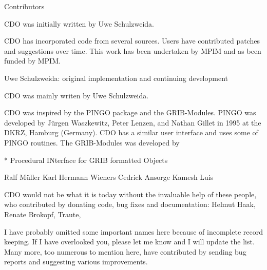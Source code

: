 Contributors

CDO was initially written by Uwe Schulzweida.

CDO has incorporated code from several sources. Users have contributed patches and suggestions over time. This work has been undertaken by MPIM and as been funded by MPIM.

Uwe Schulzweida: original implementation and continuing development

CDO was mainly writen by Uwe Schulzweida.

CDO was inspired by the PINGO package and the GRIB-Modules. 
PINGO was developed by Jürgen Waszkewitz, Peter Lenzen, and Nathan Gillet in 1995 at the DKRZ, Hamburg (Germany).
CDO has a similar user interface and uses some of PINGO routines.
The GRIB-Modules was developed by 


* Procedural INterface for GRIB formatted Objects

Ralf Müller
Karl Hermann Wieners
Cedrick Ansorge
Kamesh
Luis

CDO would not be what it is today without the invaluable help of these people, who contributed by donating code, bug fixes and documentation:
Helmut Haak, Renate Brokopf, Traute, 

I have probably omitted some important names here because of incomplete record keeping. If I have overlooked you, please let me know and I will update the list. Many more, too numerous to mention here, have contributed by sending bug reports and suggesting various improvements.
